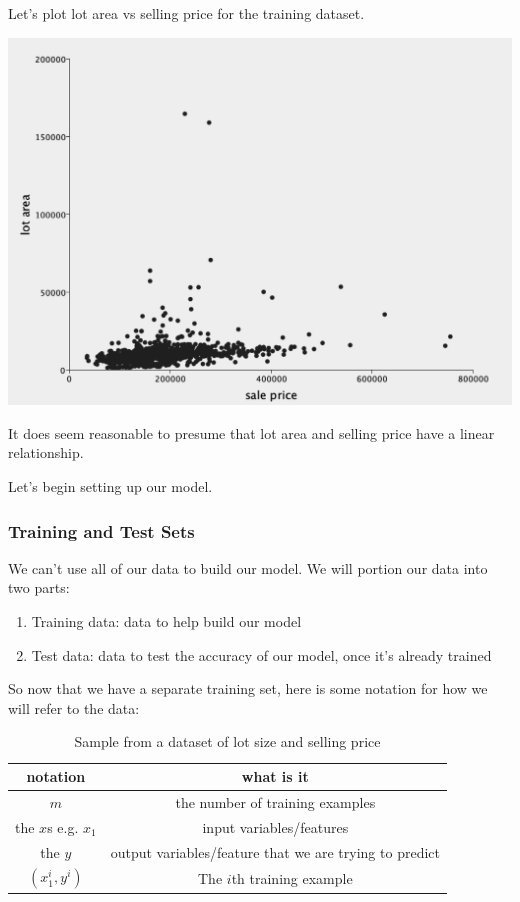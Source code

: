 \documentclass[12pt]{article}
\begin{document}
Let's plot lot area vs selling price for the training dataset.

\includegraphics[width={\textwidth}]{ames-training-set}

It does seem reasonable to presume that lot area and selling price have a linear relationship.

Let's begin setting up our model.

\subsubsection{Training and Test Sets}

We can't use all of our data to build our model. We will portion our data into two parts:

\begin{enumerate}
\item Training data: data to help build our model
\item Test data: data to test the accuracy of our model, once it's already trained
\end{enumerate}

So now that we have a separate training set, here is some notation for how we will refer to the data:
\begin{table}[htp]
\caption{Sample from a dataset of lot size and selling price}
\begin{center}
\begin{tabular}{|c|c|}
\hline
notation & what is it \\ \hline
$m$ & the number of training examples \\
the $x$s e.g. $x_1$ & input variables/features \\
the $y$ & output variables/feature that we are trying to predict \\
$(x_1^i, y^i)$ & The $i$th training example  \\
\hline
\end{tabular}
\end{center}
\label{table:sample-table-notaton}
\end{table}%
\end{document}
